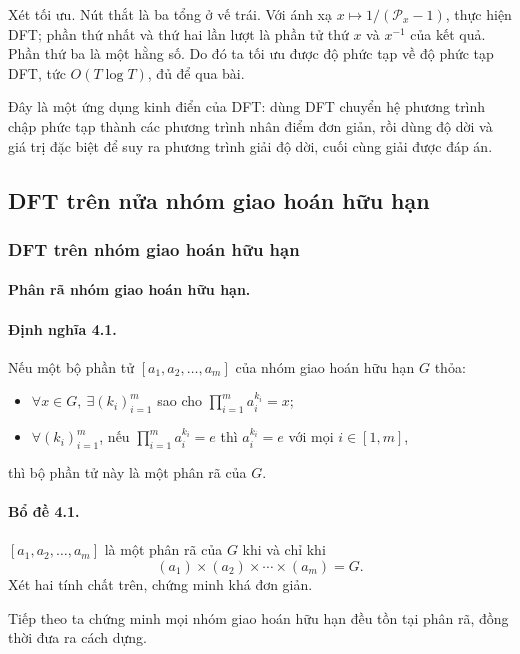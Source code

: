 \documentclass[11pt]{article}
\begin{document}
Xét tối ưu. Nút thắt là ba tổng ở vế trái. Với ánh xạ
$x\mapsto 1/(\mathcal P_x-1)$, thực hiện DFT; phần thứ nhất và thứ hai lần lượt
là phần tử thứ $x$ và $x^{-1}$ của kết quả. Phần thứ ba là một hằng số. Do đó
ta tối ưu được độ phức tạp về độ phức tạp DFT, tức $O(T\log T)$, đủ để qua bài.

Đây là một ứng dụng kinh điển của DFT: dùng DFT chuyển hệ phương trình chập phức
tạp thành các phương trình nhân điểm đơn giản, rồi dùng độ dời và giá trị đặc
biệt để suy ra phương trình giải độ dời, cuối cùng giải được đáp án.

\subsection{DFT trên nửa nhóm giao hoán hữu hạn}

\subsubsection{DFT trên nhóm giao hoán hữu hạn}

\paragraph{Phân rã nhóm giao hoán hữu hạn.}

\paragraph{Định nghĩa 4.1.}
Nếu một bộ phần tử $[a_1,a_2,\ldots,a_m]$ của nhóm giao hoán hữu hạn $G$ thỏa:
\begin{itemize}
  \item $\forall x\in G,\ \exists(k_i)_{i=1}^{m}$ sao cho
  $\prod_{i=1}^{m} a_i^{k_i}=x$;
  \item $\forall(k_i)_{i=1}^{m}$, nếu $\prod_{i=1}^{m} a_i^{k_i}=e$ thì
  $a_i^{k_i}=e$ với mọi $i\in[1,m]$,
\end{itemize}
thì bộ phần tử này là một phân rã của $G$.

\paragraph{Bổ đề 4.1.}
$[a_1,a_2,\ldots,a_m]$ là một phân rã của $G$ khi và chỉ khi
\[
  (a_1)\times(a_2)\times\cdots\times(a_m)=G.
\]
Xét hai tính chất trên, chứng minh khá đơn giản.

Tiếp theo ta chứng minh mọi nhóm giao hoán hữu hạn đều tồn tại phân rã, đồng
thời đưa ra cách dựng.
\end{document}
